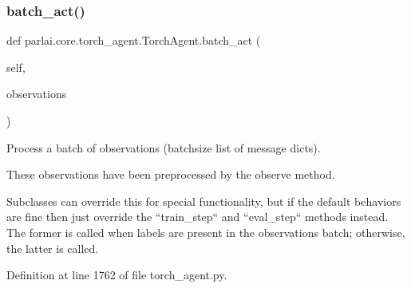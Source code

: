 \subsubsection{\texorpdfstring{batch\+\_\+act()}{batch\_act()}}
{\footnotesize\ttfamily def parlai.\+core.\+torch\+\_\+agent.\+Torch\+Agent.\+batch\+\_\+act (\begin{DoxyParamCaption}\item[{}]{self,  }\item[{}]{observations }\end{DoxyParamCaption})}

\begin{DoxyVerb}Process a batch of observations (batchsize list of message dicts).

These observations have been preprocessed by the observe method.

Subclasses can override this for special functionality, but if the
default behaviors are fine then just override the ``train_step`` and
``eval_step`` methods instead. The former is called when labels are
present in the observations batch; otherwise, the latter is called.
\end{DoxyVerb}
 

Definition at line 1762 of file torch\+\_\+agent.\+py.


